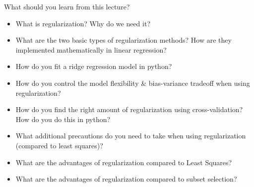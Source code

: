 \documentclass[aspectratio=169,usenames,dvipsnames]{beamer}
\begin{document}
\begin{frame}[t]{What should you learn from this lecture?}
	\begin{itemize}
		\item What is regularization? Why do we need it?
		\item What are the two basic types of regularization methods? How are they implemented mathematically in linear regression?
		\item How do you fit a ridge regression model in python?
		\item How do you control the model flexibility \& bias-variance tradeoff when using regularization?
		\item How do you find the right amount of regularization using cross-validation? How do you do this in python?
		\item What additional precautions do you need to take when using regularization (compared to least squares)?
		\item What are the advantages of regularization compared to Least Squares?
		\item What are the advantages of regularization compared to subset selection?
	\end{itemize}
\end{frame}
\end{document}
